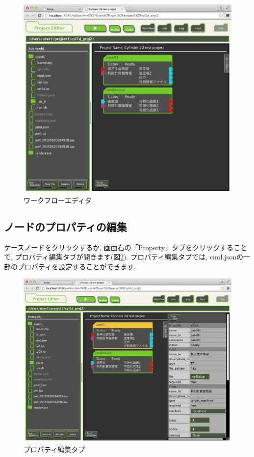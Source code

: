 \documentclass[a4paper,10pt,oneside]{jsbook}
\begin{document}
\begin{figure}[H]
	\begin{center}
		\includegraphics[width=12.0cm]{image/workflow_000.png}
	\end{center}
	\caption{ワークフローエディタ}
	\label{fig:workflow_000}
\end{figure}

\subsection{ノードのプロパティの編集}
ケースノードをクリックするか, 画面右の「Property」タブをクリックすることで, プロパティ編集タブが開きます(図\ref{fig:workflow_001}).
プロパティ編集タブでは, cmd.jsonの一部のプロパティを設定することができます.

\begin{figure}[H]
	\begin{center}
		\includegraphics[width=12.0cm]{image/workflow_001.png}
	\end{center}
	\caption{プロパティ編集タブ}
	\label{fig:workflow_001}
\end{figure}
\end{document}
